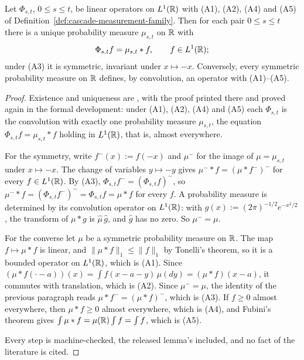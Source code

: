 \begin{theorem}
\label{thm:cited-A1}

Let $\Phi_{s,t}$, $0 \le s \le t$, be linear operators on $L^1(\mathbb{R})$ with (A1), (A2), (A4) and
(A5) of Definition~\ref{def:cascade-measurement-family}. Then for each pair $0 \le s \le t$ there
is a unique probability measure $\mu_{s,t}$ on $\mathbb{R}$ with
\[
  \Phi_{s,t}f = \mu_{s,t} * f, \qquad f \in L^1(\mathbb{R});
\]
under (A3) it is symmetric, invariant under $x \mapsto -x$. Conversely, every symmetric
probability measure on $\mathbb{R}$ defines, by convolution, an operator with (A1)--(A5).
\end{theorem}

\begin{proof}
Existence and uniqueness are , with the proof printed there
and proved again in the formal development:
under (A1), (A2), (A4) and (A5) each $\Phi_{s,t}$ is the convolution with exactly one probability
measure $\mu_{s,t}$, the equation $\Phi_{s,t}f = \mu_{s,t} * f$ holding in $L^1(\mathbb{R})$, that is,
almost everywhere.

For the symmetry, write $f^-(x) := f(-x)$ and $\mu^-$ for the image of $\mu = \mu_{s,t}$
under $x \mapsto -x$. The change of variables $y \mapsto -y$ gives
$\mu^- * f = (\mu * f^-)^-$ for every $f \in L^1(\mathbb{R})$. By (A3),
$\Phi_{s,t}f^- = (\Phi_{s,t}f)^-$, so $\mu^- * f = (\Phi_{s,t}f^-)^- =
\Phi_{s,t}f = \mu * f$ for every $f$. A probability measure is determined by its convolution
operator on $L^1(\mathbb{R})$: with $g(x) := (2\pi)^{-1/2}e^{-x^2/2}$, the transform of $\mu * g$ is
$\widehat\mu\,\widehat g$, and $\widehat g$ has no zero. So $\mu^- = \mu$.

For the converse let $\mu$ be a symmetric probability measure on $\mathbb{R}$. The map
$f \mapsto \mu * f$ is linear, and $\|\mu * f\|_1 \le \|f\|_1$ by Tonelli's theorem, so it is a
bounded operator on $L^1(\mathbb{R})$, which is (A1). Since
$(\mu * f(\cdot - a))(x) = \int f(x - a - y)\,\mu(dy) = (\mu * f)(x - a)$, it commutes with
translation, which is (A2). Since $\mu^- = \mu$, the identity of the previous paragraph reads
$\mu * f^- = (\mu * f)^-$, which is (A3). If $f \ge 0$ almost everywhere, then
$\mu * f \ge 0$ almost everywhere, which is (A4), and Fubini's theorem gives
$\int \mu * f = \mu(\mathbb{R})\int f = \int f$, which is (A5).

Every step is machine-checked, the released lemma's included, and no fact of the literature is
cited.
\end{proof}

